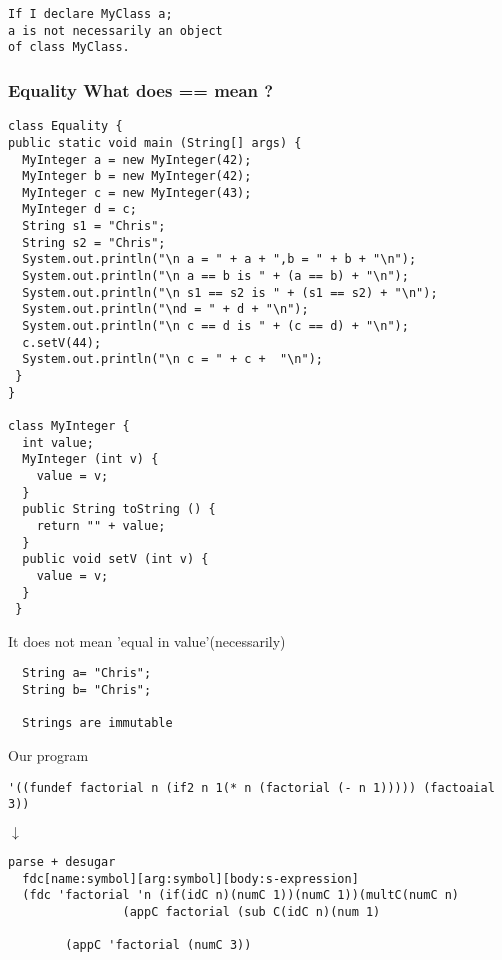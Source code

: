\documentclass{article}
\begin{document}
\begin{verbatim}
If I declare MyClass a;
a is not necessarily an object
of class MyClass.
\end{verbatim}
%

\subsubsection*{Equality What does == mean ?}
    
\begin{verbatim}
class Equality {
public static void main (String[] args) {
  MyInteger a = new MyInteger(42);
  MyInteger b = new MyInteger(42);
  MyInteger c = new MyInteger(43);
  MyInteger d = c;
  String s1 = "Chris";
  String s2 = "Chris";
  System.out.println("\n a = " + a + ",b = " + b + "\n");
  System.out.println("\n a == b is " + (a == b) + "\n");
  System.out.println("\n s1 == s2 is " + (s1 == s2) + "\n");
  System.out.println("\nd = " + d + "\n");
  System.out.println("\n c == d is " + (c == d) + "\n");
  c.setV(44);
  System.out.println("\n c = " + c +  "\n");
 }
}

class MyInteger {
  int value;
  MyInteger (int v) {
    value = v;
  }
  public String toString () {
    return "" + value;
  }
  public void setV (int v) {
    value = v;
  }
 }
\end{verbatim}    

\doublespacing   
\begin{flushleft}
  It does not mean 'equal in value'(necessarily) 
  \end{flushleft}  
  
  \begin{verbatim}
  String a= "Chris";
  String b= "Chris";
  
  Strings are immutable
  \end{verbatim}
   
    
\begin{flushleft}
Our program
\begin{verbatim}
'((fundef factorial n (if2 n 1(* n (factorial (- n 1))))) (factoaial 3))
\end{verbatim}
\end{flushleft}
$\downarrow$
\begin{verbatim}
parse + desugar
  fdc[name:symbol][arg:symbol][body:s-expression]
  (fdc 'factorial 'n (if(idC n)(numC 1))(numC 1))(multC(numC n)
  				(appC factorial (sub C(idC n)(num 1)
  				
  		(appC 'factorial (numC 3))
\end{verbatim}
\end{document}
